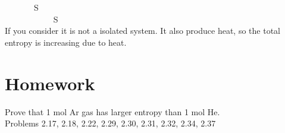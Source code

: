 \documentclass[twoside]{article}
\begin{document}
 ~~~~~~~S\\
~~~~~~~~~~~ S\\
If you consider it is not a isolated system. It also produce heat, so the total entropy is increasing due to heat.

\section{Homework}
Prove that 1 mol Ar gas has larger entropy than 1 mol He.\\
Problems 2.17, 2.18, 2.22, 2.29, 2.30, 2.31, 2.32, 2.34, 2.37
\end{document}
